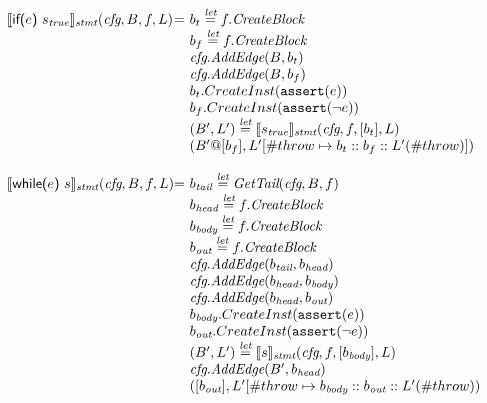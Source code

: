 \[\begin{array}{l@{}l@{~}l}
\transfun{\ircfgif{e}{s_{\emph{true}}}{}}_{\emph{stmt}}(\emph{cfg}, B, f, L) & = &
b_t \letval f.\emph{CreateBlock}\\
& & b_f \letval f.\emph{CreateBlock}\\
& & \emph{cfg}.\emph{AddEdge}(B, b_t)\\
& & \emph{cfg}.\emph{AddEdge}(B, b_f)\\
& & b_t.CreateInst(\TT{assert}(e))\\
& & b_f.CreateInst(\TT{assert}(\neg e))\\
& & (B', L') \letval \transfun{s_{\emph{true}}}_{\emph{stmt}}(\emph{cfg}, f, [b_t], L)\\
& & (B'@[b_f], L'[\#throw \mapsto b_t::b_f::L'(\#throw)])\\
& & \\

\transfun{\ircfgwhile{e}{s}}_{\emph{stmt}}(\emph{cfg}, B, f, L) & = &
b_{\emph{tail}} \letval \GetTail(\emph{cfg}, B, f)\\
& & b_{\emph{head}} \letval f.\emph{CreateBlock}\\
& & b_{\emph{body}} \letval f.\emph{CreateBlock}\\
& & b_{\emph{out}} \letval f.\emph{CreateBlock}\\
& & \emph{cfg}.\emph{AddEdge}(b_{\emph{tail}}, b_{\emph{head}})\\
& & \emph{cfg}.\emph{AddEdge}(b_{\emph{head}}, b_{\emph{body}})\\
& & \emph{cfg}.\emph{AddEdge}(b_{\emph{head}}, b_{\emph{out}})\\
& & b_{\emph{body}}.CreateInst(\TT{assert}(e))\\
& & b_{\emph{out}}.CreateInst(\TT{assert}(\neg e))\\
& & (B', L') \letval \transfun{s}_{\emph{stmt}}(\emph{cfg}, f, [b_{\emph{body}}], L)\\
& & \emph{cfg}.\emph{AddEdge}(B', b_{\emph{head}})\\
& & ([b_{\emph{out}}], L'[\#throw \mapsto b_{\emph{body}} :: b_{\emph{out}} :: L'(\#throw)) \\
\end{array}
\]
